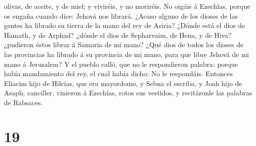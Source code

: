 olivas, de aceite, y de miel; y viviréis, y no moriréis. No oigáis á
Ezechîas, porque os engaña cuando dice: Jehová nos librará.
 ¿Acaso alguno de los dioses de las gentes ha librado su
tierra de la mano del rey de Asiria?  ¿Dónde está el dios
de Hamath, y de Arphad? ¿dónde el dios de Sepharvaim, de Hena, y de
Hiva? ¿pudieron éstos librar á Samaria de mi mano?  ¿Qué
dios de todos los dioses de las provincias ha librado á su provincia de
mi mano, para que libre Jehová de mi mano á Jerusalem?  Y
el pueblo calló, que no le respondieron palabra: porque había
mandamiento del rey, el cual había dicho: No le respondáis.
 Entonces Eliacim hijo de Hilcías, que era mayordomo, y
Sebna el escriba, y Joah hijo de Asaph, canciller, vinieron á Ezechîas,
rotos sus vestidos, y recitáronle las palabras de Rabsaces.

\hypertarget{section-18}{%
\section{19}\label{section-18}}

